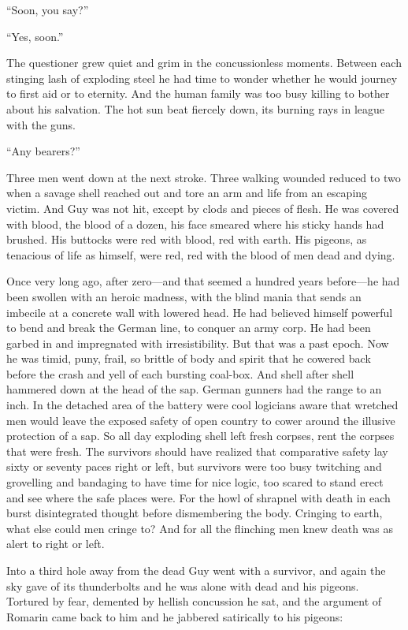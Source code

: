 ``Soon, you say?''

``Yes, soon.''

The questioner grew quiet and grim in the concussionless moments. Between each stinging lash of exploding steel he had time to wonder whether he would journey to first aid or to eternity. And the human family was too busy killing to bother about his salvation. The hot sun beat fiercely down, its burning rays in league with the guns.

``Any bearers?''

Three men went down at the next stroke. Three walking wounded reduced to two when a savage shell reached out and tore an arm and life from an escaping victim. And Guy was not hit, except by clods and pieces of flesh. He was covered with blood, the blood of a dozen, his face smeared where his sticky hands had brushed. His buttocks were red with blood, red with earth. His pigeons, as tenacious of life as himself, were red, red with the blood of men dead and dying.

Once very long ago, after zero---and that seemed a hundred years before---he had been swollen with an heroic madness, with the blind mania that sends an imbecile at a concrete wall with lowered head. He had believed himself powerful to bend and break the German line, to conquer an army corp. He had been garbed in and impregnated with irresistibility. But that was a past epoch. Now he was timid, puny, frail, so brittle of body and spirit that he cowered back before the crash and yell of each bursting coal-box. And shell after shell hammered down at the head of the sap. German gunners had the range to an inch. In the detached area of the battery were cool logicians aware that wretched men would leave the exposed safety of open country to cower around the illusive protection of a sap. So all day exploding shell left fresh corpses, rent the corpses that were fresh. The survivors should have realized that comparative safety lay sixty or seventy paces right or left, but survivors were too busy twitching and grovelling and bandaging to have time for nice logic, too scared to stand erect and see where the safe places were. For the howl of shrapnel with death in each burst disintegrated thought before dismembering the body. Cringing to earth, what else could men cringe to? And for all the flinching men knew death was as alert to right or left.

Into a third hole away from the dead Guy went with a survivor, and again the sky gave of its thunderbolts and he was alone with dead and his pigeons. Tortured by fear, demented by hellish concussion he sat, and the argument of Romarin came back to him and he jabbered satirically to his pigeons:

